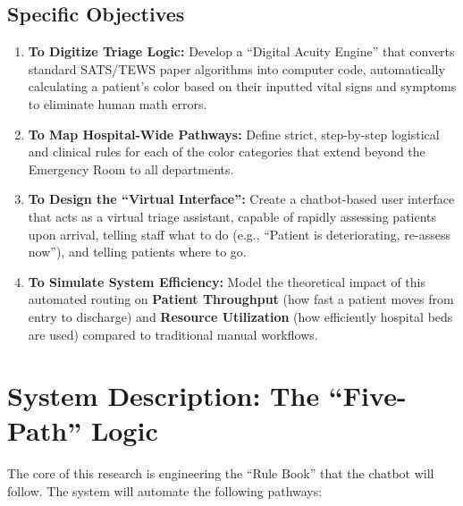\documentclass[12pt, a4paper]{article}
\begin{document}
	\subsection*{Specific Objectives}
	\begin{enumerate}
		\item \textbf{To Digitize Triage Logic:} Develop a ``Digital Acuity Engine'' that converts standard SATS/TEWS paper algorithms into computer code, automatically calculating a patient's color based on their inputted vital signs and symptoms to eliminate human math errors.
		\item \textbf{To Map Hospital-Wide Pathways:} Define strict, step-by-step logistical and clinical rules for each of the color categories that extend beyond the Emergency Room to all departments.
		\item \textbf{To Design the ``Virtual Interface'':} Create a chatbot-based user interface that acts as a virtual triage assistant, capable of rapidly assessing patients upon arrival, telling staff what to do (e.g., ``Patient is deteriorating, re-assess now''), and telling patients where to go.
		\item \textbf{To Simulate System Efficiency:} Model the theoretical impact of this automated routing on \textbf{Patient Throughput} (how fast a patient moves from entry to discharge) and \textbf{Resource Utilization} (how efficiently hospital beds are used) compared to traditional manual workflows.
		
	\end{enumerate}
	
	\section{System Description: The ``Five-Path'' Logic}
	The core of this research is engineering the ``Rule Book'' that the chatbot will follow. The system will automate the following pathways:
	
\end{document}
